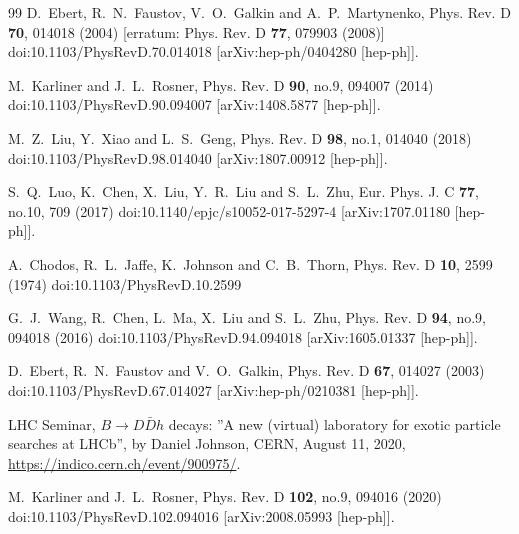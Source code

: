 \documentclass[prd,twocolumn,floatfix,nofootinbib]{revtex4}
\begin{document}
\begin{thebibliography}{99}
    D.~Ebert, R.~N.~Faustov, V.~O.~Galkin and A.~P.~Martynenko,
    Phys. Rev. D \textbf{70}, 014018 (2004)
    [erratum: Phys. Rev. D \textbf{77}, 079903 (2008)]
    doi:10.1103/PhysRevD.70.014018
    [arXiv:hep-ph/0404280 [hep-ph]].

    M.~Karliner and J.~L.~Rosner,
    Phys. Rev. D \textbf{90}, no.9, 094007 (2014)
    doi:10.1103/PhysRevD.90.094007
    [arXiv:1408.5877 [hep-ph]].

    M.~Z.~Liu, Y.~Xiao and L.~S.~Geng,
    Phys. Rev. D \textbf{98}, no.1, 014040 (2018)
    doi:10.1103/PhysRevD.98.014040
    [arXiv:1807.00912 [hep-ph]].

    S.~Q.~Luo, K.~Chen, X.~Liu, Y.~R.~Liu and S.~L.~Zhu,
    Eur. Phys. J. C \textbf{77}, no.10, 709 (2017)
    doi:10.1140/epjc/s10052-017-5297-4
    [arXiv:1707.01180 [hep-ph]].

    A.~Chodos, R.~L.~Jaffe, K.~Johnson and C.~B.~Thorn,
    Phys. Rev. D \textbf{10}, 2599 (1974)
    doi:10.1103/PhysRevD.10.2599

    G.~J.~Wang, R.~Chen, L.~Ma, X.~Liu and S.~L.~Zhu,
    Phys. Rev. D \textbf{94}, no.9, 094018 (2016)
    doi:10.1103/PhysRevD.94.094018
    [arXiv:1605.01337 [hep-ph]].

    D.~Ebert, R.~N.~Faustov and V.~O.~Galkin,
    Phys. Rev. D \textbf{67}, 014027 (2003)
    doi:10.1103/PhysRevD.67.014027
    [arXiv:hep-ph/0210381 [hep-ph]].

 LHC Seminar, 
    $B\to D\bar{D}h$ decays: ''A new (virtual) laboratory for exotic particle searches at LHCb'', 
    by Daniel Johnson, CERN, August 11, 2020, 
    \href{https://indico.cern.ch/event/900975/}{https://indico.cern.ch/event/900975/}.

    M.~Karliner and J.~L.~Rosner,
    Phys. Rev. D \textbf{102}, no.9, 094016 (2020)
    doi:10.1103/PhysRevD.102.094016
    [arXiv:2008.05993 [hep-ph]].


\end{thebibliography}
\end{document}
